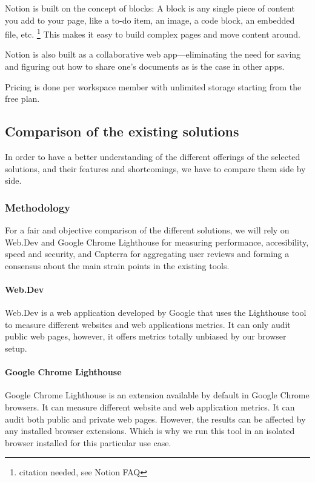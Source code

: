 Notion is built on the concept of blocks: A block is any single piece
of content you add to your page, like a to-do item, an image, a code
block, an embedded file, etc. \footnote{citation needed, see Notion FAQ}
This makes it easy to build complex pages and move content around.

Notion is also built as a collaborative web app---eliminating the need
for saving and figuring out how to share one's documents as is the case
in other apps.

Pricing is done per workspace member with unlimited storage starting
from the free plan.

\subsection{Comparison of the existing solutions}

In order to have a better understanding of the different offerings of the selected solutions, and their features and shortcomings, we have to compare them side by side.

\subsubsection{Methodology}

For a fair and objective comparison of the different solutions, we will rely on Web.Dev and Google Chrome Lighthouse for measuring performance, accesibility, speed and security, and Capterra for aggregating user reviews and forming a consensus about the main strain points in the existing tools.

\paragraph{Web.Dev}

Web.Dev is a web application developed by Google that uses the Lighthouse tool to measure different websites and web applications metrics. It can only audit public web pages, however, it offers metrics totally unbiased by our browser setup.

\paragraph{Google Chrome Lighthouse}


Google Chrome Lighthouse is an extension available by default in Google Chrome browsers.
It can measure different website and web application metrics.
It can audit both public and private web pages. However, the results can be affected by any installed browser extensions.
Which is why we run this tool in an isolated browser installed for this particular use case.

